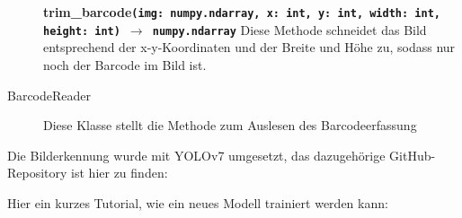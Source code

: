 \begin{description}
\begin{addmargin}{0.2cm}
      \textbf{trim\_barcode\texttt{(img: numpy.ndarray, x: int, y: int, width: int, height: int)}}\ \linebreak \textbf{\texttt{$\rightarrow$ numpy.ndarray}} Diese Methode schneidet das Bild entsprechend der x-y-Koordinaten und der Breite und Höhe zu, sodass nur noch der Barcode im Bild ist.
    \end{addmargin}
  \item[BarcodeReader] Diese Klasse stellt die Methode zum Auslesen des Barcodeerfassung
\end{description}

Die Bilderkennung wurde mit YOLOv7 umgesetzt, das dazugehörige GitHub-Repository ist hier zu finden:


Hier ein kurzes Tutorial, wie ein neues Modell trainiert werden kann:

